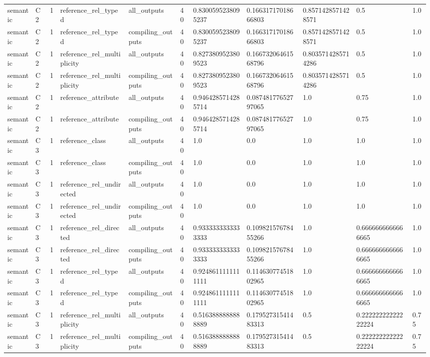\begin{tabular}{lllllllllll}
semantic & C2 & 1 & reference\_rel\_typed & all\_outputs & 40 & 0.8300595238095237 & 0.16631717018666803 & 0.8571428571428571 & 0.5 & 1.0 \\
semantic & C2 & 1 & reference\_rel\_typed & compiling\_outputs & 40 & 0.8300595238095237 & 0.16631717018666803 & 0.8571428571428571 & 0.5 & 1.0 \\
semantic & C2 & 1 & reference\_rel\_multiplicity & all\_outputs & 40 & 0.8273809523809523 & 0.16673206461568796 & 0.8035714285714286 & 0.5 & 1.0 \\
semantic & C2 & 1 & reference\_rel\_multiplicity & compiling\_outputs & 40 & 0.8273809523809523 & 0.16673206461568796 & 0.8035714285714286 & 0.5 & 1.0 \\
semantic & C2 & 1 & reference\_attribute & all\_outputs & 40 & 0.9464285714285714 & 0.08748177652797065 & 1.0 & 0.75 & 1.0 \\
semantic & C2 & 1 & reference\_attribute & compiling\_outputs & 40 & 0.9464285714285714 & 0.08748177652797065 & 1.0 & 0.75 & 1.0 \\
semantic & C3 & 1 & reference\_class & all\_outputs & 40 & 1.0 & 0.0 & 1.0 & 1.0 & 1.0 \\
semantic & C3 & 1 & reference\_class & compiling\_outputs & 40 & 1.0 & 0.0 & 1.0 & 1.0 & 1.0 \\
semantic & C3 & 1 & reference\_rel\_undirected & all\_outputs & 40 & 1.0 & 0.0 & 1.0 & 1.0 & 1.0 \\
semantic & C3 & 1 & reference\_rel\_undirected & compiling\_outputs & 40 & 1.0 & 0.0 & 1.0 & 1.0 & 1.0 \\
semantic & C3 & 1 & reference\_rel\_directed & all\_outputs & 40 & 0.9333333333333333 & 0.10982157678455266 & 1.0 & 0.6666666666666665 & 1.0 \\
semantic & C3 & 1 & reference\_rel\_directed & compiling\_outputs & 40 & 0.9333333333333333 & 0.10982157678455266 & 1.0 & 0.6666666666666665 & 1.0 \\
semantic & C3 & 1 & reference\_rel\_typed & all\_outputs & 40 & 0.9248611111111111 & 0.11463077451802965 & 1.0 & 0.6666666666666665 & 1.0 \\
semantic & C3 & 1 & reference\_rel\_typed & compiling\_outputs & 40 & 0.9248611111111111 & 0.11463077451802965 & 1.0 & 0.6666666666666665 & 1.0 \\
semantic & C3 & 1 & reference\_rel\_multiplicity & all\_outputs & 40 & 0.5163888888888889 & 0.17952731541483313 & 0.5 & 0.22222222222222224 & 0.75 \\
semantic & C3 & 1 & reference\_rel\_multiplicity & compiling\_outputs & 40 & 0.5163888888888889 & 0.17952731541483313 & 0.5 & 0.22222222222222224 & 0.75 \\

\end{tabular}

